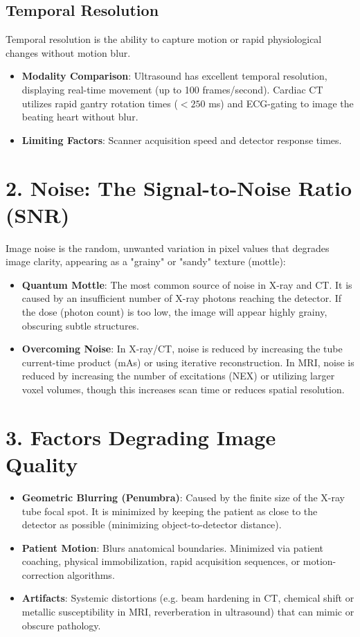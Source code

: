 \subsection*{Temporal Resolution}
Temporal resolution is the ability to capture motion or rapid physiological changes without motion blur.
\begin{itemize}
    \item \textbf{Modality Comparison}: Ultrasound has excellent temporal resolution, displaying real-time movement (up to 100 frames/second). Cardiac CT utilizes rapid gantry rotation times ($< 250$ ms) and ECG-gating to image the beating heart without blur.
    \item \textbf{Limiting Factors}: Scanner acquisition speed and detector response times.
\end{itemize}


\section*{2. Noise: The Signal-to-Noise Ratio (SNR)}
Image noise is the random, unwanted variation in pixel values that degrades image clarity, appearing as a "grainy" or "sandy" texture (mottle):

\begin{itemize}
    \item \textbf{Quantum Mottle}: The most common source of noise in X-ray and CT. It is caused by an insufficient number of X-ray photons reaching the detector. If the dose (photon count) is too low, the image will appear highly grainy, obscuring subtle structures.
    \item \textbf{Overcoming Noise}: In X-ray/CT, noise is reduced by increasing the tube current-time product (mAs) or using iterative reconstruction. In MRI, noise is reduced by increasing the number of excitations (NEX) or utilizing larger voxel volumes, though this increases scan time or reduces spatial resolution.
\end{itemize}


\section*{3. Factors Degrading Image Quality}
\begin{itemize}
    \item \textbf{Geometric Blurring (Penumbra)}: Caused by the finite size of the X-ray tube focal spot. It is minimized by keeping the patient as close to the detector as possible (minimizing object-to-detector distance).
    \item \textbf{Patient Motion}: Blurs anatomical boundaries. Minimized via patient coaching, physical immobilization, rapid acquisition sequences, or motion-correction algorithms.
    \item \textbf{Artifacts}: Systemic distortions (e.g. beam hardening in CT, chemical shift or metallic susceptibility in MRI, reverberation in ultrasound) that can mimic or obscure pathology.
\end{itemize}


